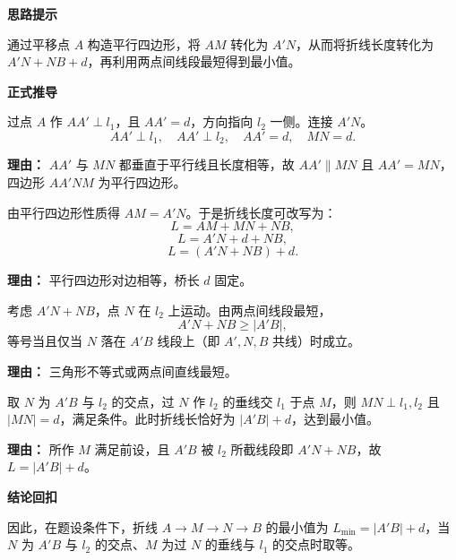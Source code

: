 \begin{proofbox}
	\textbf{\textcolor{CProof}{思路提示}}
	\par 通过平移点 $A$ 构造平行四边形，将 $AM$ 转化为 $A'N$，从而将折线长度转化为 $A'N+NB+d$，再利用两点间线段最短得到最小值。

	\medskip
	\textbf{\textcolor{CProof}{正式推导}}
	\begin{description}[style=nextline, leftmargin=2.8em, labelsep=0.5em, itemsep=0.55em]
		\item[\textbf{步骤一（平移构造）：}]
			过点 $A$ 作 $AA' \perp l_1$，且 $AA'=d$，方向指向 $l_2$ 一侧。连接 $A'N$。
			\[
				AA' \perp l_1,\quad AA' \perp l_2,\quad AA' = d,\quad MN = d.
			\]
			\par \textbf{理由：} $AA'$ 与 $MN$ 都垂直于平行线且长度相等，故 $AA' \parallel MN$ 且 $AA' = MN$，四边形 $AA'NM$ 为平行四边形。
		\item[\textbf{步骤二（等量代换）：}]
			由平行四边形性质得 $AM = A'N$。于是折线长度可改写为：
			\[
				L = AM + MN + NB,
			\]
			\[
				L = A'N + d + NB,
			\]
			\[
				L = (A'N + NB) + d.
			\]
			\par \textbf{理由：} 平行四边形对边相等，桥长 $d$ 固定。
		\item[\textbf{步骤三（最值转化）：}]
			考虑 $A'N+NB$，点 $N$ 在 $l_2$ 上运动。由两点间线段最短，
			\[
				A'N + NB \ge |A'B|,
			\]
			等号当且仅当 $N$ 落在 $A'B$ 线段上（即 $A',N,B$ 共线）时成立。 \par \textbf{理由：} 三角形不等式或两点间直线最短。
		\item[\textbf{步骤四（取等构造）：}]
			取 $N$ 为 $A'B$ 与 $l_2$ 的交点，过 $N$ 作 $l_2$ 的垂线交 $l_1$ 于点 $M$，则 $MN \perp l_1,l_2$ 且 $|MN|=d$，满足条件。此时折线长恰好为 $|A'B|+d$，达到最小值。 \par \textbf{理由：} 所作 $M$ 满足前设，且 $A'B$ 被 $l_2$ 所截线段即 $A'N+NB$，故 $L = |A'B|+d$。
	\end{description}

	\medskip
	\textbf{\textcolor{CProof}{结论回扣}}
	\par 因此，在题设条件下，折线 $A\to M\to N\to B$ 的最小值为 $L_{\min}=|A'B|+d$，当 $N$ 为 $A'B$ 与 $l_2$ 的交点、$M$ 为过 $N$ 的垂线与 $l_1$ 的交点时取等。
\end{proofbox}
